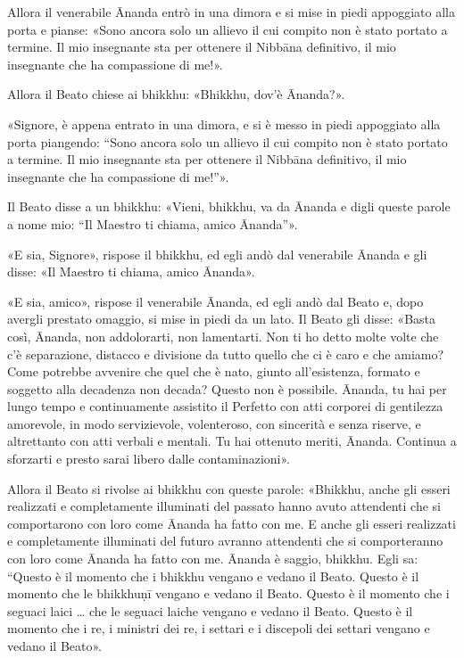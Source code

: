 Allora il venerabile Ānanda entrò in una dimora e si mise in piedi appoggiato
alla porta e pianse: «Sono ancora solo un allievo il cui compito non è stato
portato a termine. Il mio insegnante sta per ottenere il Nibbāna definitivo, il
mio insegnante che ha compassione di me!».

Allora il Beato chiese ai bhikkhu: «Bhikkhu, dov’è Ānanda?».

«Signore, è appena entrato in una dimora, e si è messo in piedi appoggiato alla
porta piangendo: “Sono ancora solo un allievo il cui compito non è stato portato
a termine. Il mio insegnante sta per ottenere il Nibbāna definitivo, il mio
insegnante che ha compassione di me!”».

Il Beato disse a un bhikkhu: «Vieni, bhikkhu, va da Ānanda e digli queste parole
a nome mio: “Il Maestro ti chiama, amico Ānanda”».

«E sia, Signore», rispose il bhikkhu, ed egli andò dal venerabile Ānanda e gli
disse: «Il Maestro ti chiama, amico Ānanda».

«E sia, amico», rispose il venerabile Ānanda, ed egli andò dal Beato e, dopo
avergli prestato omaggio, si mise in piedi da un lato. Il Beato gli disse:
«Basta così, Ānanda, non addolorarti, non lamentarti. Non ti ho detto molte
volte che c’è separazione, distacco e divisione da tutto quello che ci è caro e
che amiamo? Come potrebbe avvenire che quel che è nato, giunto all’esistenza,
formato e soggetto alla decadenza non decada? Questo non è possibile. Ānanda, tu
hai per lungo tempo e continuamente assistito il Perfetto con atti corporei di
gentilezza amorevole, in modo servizievole, volenteroso, con sincerità e senza
riserve, e altrettanto con atti verbali e mentali. Tu hai ottenuto meriti,
Ānanda. Continua a sforzarti e presto sarai libero dalle contaminazioni».

Allora il Beato si rivolse ai bhikkhu con queste parole: «Bhikkhu, anche gli
esseri realizzati e completamente illuminati del passato hanno avuto attendenti
che si comportarono con loro come Ānanda ha fatto con me. E anche gli esseri
realizzati e completamente illuminati del futuro avranno attendenti che si
comporteranno con loro come Ānanda ha fatto con me. Ānanda è saggio, bhikkhu.
Egli sa: “Questo è il momento che i bhikkhu vengano e vedano il Beato. Questo è
il momento che le bhikkhuṇī vengano e vedano il Beato. Questo è il momento che i
seguaci laici … che le seguaci laiche vengano e vedano il Beato. Questo è il
momento che i re, i ministri dei re, i settari e i discepoli dei settari vengano
e vedano il Beato».

